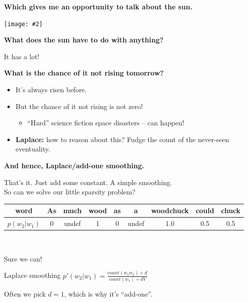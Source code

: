 \documentclass{beamer}
\newcommand{\pagestep}[2]{
  \begin{frame}[t]
    \begin{minipage}[t][0.26\textheight][t]{\textwidth}
      \begin{center}
        \huge
        \textbf{#1}
      \end{center}
    \end{minipage}
    
    \begin{minipage}[t][0.7\textheight][c]{\textwidth}
      \begin{center}
        \texttt{[image: \#2]}
      \end{center}
    \end{minipage}
  \end{frame}
}
\newcommand{\pagestepalt}[2]{
  \begin{frame}[t]
    \begin{minipage}[t][0.26\textheight][t]{\textwidth}
      \begin{center}
        \huge
        \textbf{#1}
      \end{center}
    \end{minipage}
    
    \begin{minipage}[t][0.7\textheight][t]{\textwidth}
      #2
    \end{minipage}
  \end{frame}
}
\begin{document}
\pagestep{Which gives me an opportunity to talk about the sun.}{images/sunalso.jpg}

\pagestepalt{What does the sun have to do with anything?}{
  \pause It has a lot!\pause 
  \begin{center}
    \textbf{What is the chance of it not rising tomorrow?}
  \end{center}\pause
  \begin{itemize}
  \item It's always risen before.\pause
  \item But the chance of it not rising is not zero!
    \begin{itemize}
    \item ``Hard'' science fiction space disasters -- can happen!\pause
    \end{itemize}
  \item \textbf{Laplace:} how to reason about this?  Fudge the count
    of the never-seen eventuality.
  \end{itemize}
}

\pagestepalt{And hence, \alert{Laplace/add-one smoothing}.}{
  That's it.  Just add some constant.  A simple smoothing.\pause\\
  So can we solve our little sparsity problem?

  \begin{tabular}{c|cccccccc}
    word & As & much & wood & as & a & woodchuck & could & chuck\\
    \hline
    $p(w_2|w_1)$ &\alert{0}&\alert{undef}&\alert{1} & \alert{0} & \alert{undef} & \alert{1.0} & \alert{0.5} & 0.5 \\
  \end{tabular}  \\\pause

  \vspace{0.1cm}
  Sure we can!
  \begin{block}{Laplace smoothing}
    $p'(w_2|w_1) = \frac{count(w_1 w_2) + d}{count(w_1) + dV}$
  \end{block}
  Often we pick $d=1$, which is why it's ``add-one''.
}
\end{document}

